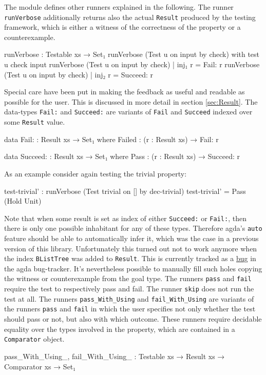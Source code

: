 \documentclass[10pt,a4paper]{article}
\begin{document}
The module defines other runners explained in the following.
The runner \texttt{runVerbose} additionally returns also the actual \texttt{Result} produced by the testing framework, which is either a witness of the correctness of the property or a counterexample.
\begin{code}
runVerbose : Testable xs → Set₁
runVerbose (Test u on input by check) with test u check input
runVerbose (Test u on input by check) | inj₁ r = Fail: r
runVerbose (Test u on input by check) | inj₂ r = Succeed: r
\end{code}
Special care have been put in making the feedback as useful and readable as possible for the user. This is discussed in more detail in section 	\ref{sec:Result}.
The data-types \texttt{Fail:} and \texttt{Succeed:} are variants of \texttt{Fail} and \texttt{Succeed} indexed over some \texttt{Result} value.
\begin{code}
data Fail: : Result xs → Set₁ where
  Failed : (r : Result xs) → Fail: r

data Succeed: : Result xs → Set₁ where
  Pass : (r : Result xs) → Succeed: r
\end{code}
As an example consider again testing the trivial property:
\begin{code}
test-trivial' : runVerbose (Test trivial on [] by dec-trivial)
test-trivial' = Pass (Hold Unit)
\end{code}
Note that when some result is set as index of either \texttt{Succeed:} or \texttt{Fail:}, then there is only one possible inhabitant for any of these types. Therefore agda's \texttt{auto} feature should be able to automatically infer it, which was the case in a 	previous version of this library. 
Unfortunately this turned out not to work anymore when the index \texttt{BListTree} was added to \texttt{Result}. This is currently tracked as a \href{http://code.google.com/p/agda/issues/detail?id=1223}{bug} in the agda bug-tracker. It's nevertheless possible to manually fill such holes copying the witness or counterexample from the goal type.
The runners \texttt{pass} and \texttt{fail} require the test to respectively pass and fail. The runner \texttt{skip} does not run the test at all.
The runners \texttt{pass\_With\_Using} and \texttt{fail\_With\_Using} are variants of the runners \texttt{pass} and \texttt{fail} in which the user specifies not only whether the test should pass or not, but also with which outcome.
These runners require decidable equality over the types involved in the property, which are contained in a \texttt{Comparator} object.
\begin{code}
pass_With_Using_, fail_With_Using_ : Testable xs → Result xs → 
                                     Comparator xs → Set₁
\end{code}
\end{document}
